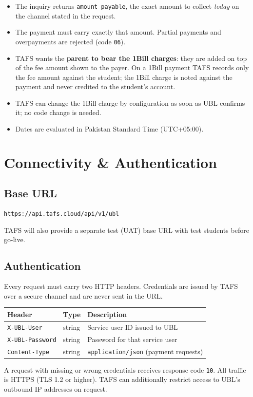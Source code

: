 \documentclass[11pt]{article}
\begin{document}
\begin{itemize}[nosep]
  \item The inquiry returns \texttt{amount\_payable}, the exact amount to collect \emph{today} on the channel stated in the request.
  \item The payment must carry exactly that amount. Partial payments and overpayments are rejected (code \texttt{06}).
  \item TAFS wants the \textbf{parent to bear the 1Bill charges}: they are added on top of the fee amount shown to the payer.
        On a 1Bill payment TAFS records only the fee amount against the student; the 1Bill charge is noted against the
        payment and never credited to the student's account.
  \item TAFS can change the 1Bill charge by configuration as soon as UBL confirms it; no code change is needed.
  \item Dates are evaluated in Pakistan Standard Time (UTC+05:00).
\end{itemize}

\section{Connectivity \& Authentication}

\subsection{Base URL}
\begin{lstlisting}
https://api.tafs.cloud/api/v1/ubl
\end{lstlisting}
TAFS will also provide a separate test (UAT) base URL with test students before go-live.

\subsection{Authentication}
Every request must carry two HTTP headers. Credentials are issued by TAFS over a secure channel
and are never sent in the URL.
\begin{center}
\begin{tabular}{@{}lll@{}}
\toprule
\textbf{Header} & \textbf{Type} & \textbf{Description} \\
\midrule
\texttt{X-UBL-User} & string & Service user ID issued to UBL \\
\texttt{X-UBL-Password} & string & Password for that service user \\
\texttt{Content-Type} & string & \texttt{application/json} (payment requests) \\
\bottomrule
\end{tabular}
\end{center}
A request with missing or wrong credentials receives response code \texttt{10}. All traffic is
HTTPS (TLS 1.2 or higher). TAFS can additionally restrict access to UBL's outbound IP addresses on request.
\end{document}
